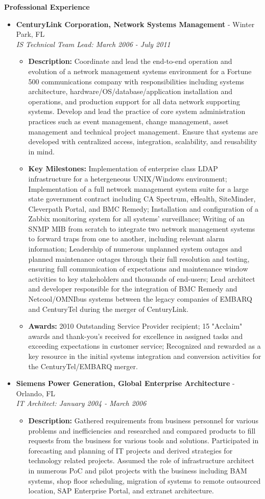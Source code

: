 \documentclass[10pt,oneside]{article}
\newenvironment{ressection}[1]{
  \vspace{4pt}
  \textbf{\selectfont\normalsize#1}
  \begin{itemize}
  \vspace{3pt}
}{
  \end{itemize}
}
\newcommand{\ressubitem}[1]{
  \vspace{-1pt}
  \item \begin{flushleft} #1 \end{flushleft}
}
\newcommand{\resbigitem}[3]{
  \vspace{-5pt}
  \item
  \textbf{#1} - #2 \\
  \textit{#3}
}
\newenvironment{ressubsec}[3]{
  \resbigitem{#1}{#2}{#3}
  \vspace{-2pt}
  \begin{itemize}
}{
  \end{itemize}
}
\begin{document}
\begin{ressection}{Professional Experience}
\begin{ressubsec}{CenturyLink Corporation, Network Systems Management}{Winter Park, FL}{IS Technical Team Lead: March 2006 - July 2011}
    \ressubitem{\textbf{Description:} Coordinate and lead the end-to-end operation and evolution of a network management systems environment for a Fortune 500 communications company with responsibilities including systems architecture, hardware/OS/database/application installation and operations, and production support for all data network supporting systems. Develop and lead the practice of core system administration practices such as event management, change management, asset management and technical project management. Ensure that systems are developed with centralized access, integration, scalability, and reusability in mind.}

    \ressubitem{\textbf{Key Milestones:} Implementation of enterprise class LDAP infrastructure for a hetergeneous UNIX/Windows environment; Implementation of a full network management system suite for a large state government contract including CA Spectrum, eHealth, SiteMinder, Cleverpath Portal, and BMC Remedy; Installation and configuration of a Zabbix monitoring system for all systems' surveillance; Writing of an SNMP MIB from scratch to integrate two network management systems to forward traps from one to another, including relevant alarm information; Leadership of numerous unplanned system outages and planned maintenance outages through their full resolution and testing, ensuring full communication of expectations and maintenance window activities to key stakeholders and thousands of end-users; Lead architect and developer responsible for the integration of BMC Remedy and Netcool/OMNIbus systems between the legacy companies of EMBARQ and CenturyTel during the merger of CenturyLink.}
    
    \ressubitem{\textbf{Awards:} 2010 Outstanding Service Provider recipient; 15 "Acclaim" awards and thank-you's received for excellence in assigned tasks and exceeding expectations in customer service; Recognized and rewarded as a key resource in the initial systems integration and conversion activities for the CenturyTel/EMBARQ merger.}

  \end{ressubsec}

  \begin{ressubsec}{Siemens Power Generation, Global Enterprise Architecture}{Orlando, FL}{IT Architect: January 2004 - March 2006}

    \ressubitem{\textbf{Description:} Gathered requirements from business personnel for various problems and inefficiencies and researched and compared products to fill requests from the business for various tools and solutions. Participated in forecasting and planning of IT projects and derived strategies for technology related projects. Assumed the role of infrastructure architect in numerous PoC and pilot projects with the business including BAM systems, shop floor scheduling, migration of systems to remote outsourced location, SAP Enterprise Portal, and extranet architecture.}


\end{ressubsec}
\end{ressection}
\end{document}
